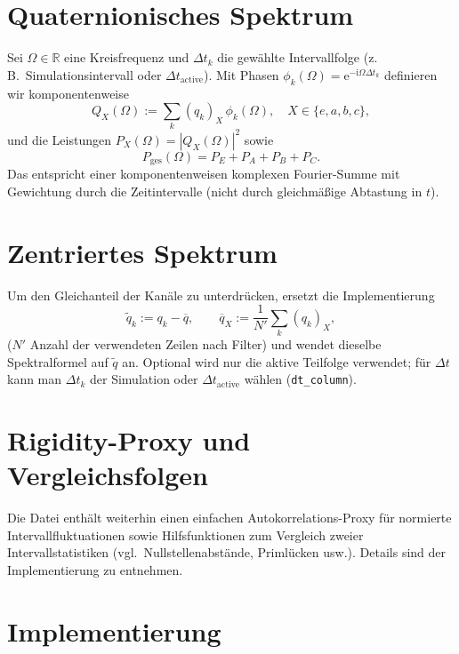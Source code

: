 \documentclass[11pt,a4paper]{article}
\begin{document}
\section{Quaternionisches Spektrum}
\label{sec:spektrum}

Sei $\Omega\in\mathbb{R}$ eine Kreisfrequenz und $\Delta t_k$ die gewählte Intervallfolge
(z.\,B.\ Simulationsintervall oder $\Delta t_{\mathrm{active}}$).
Mit Phasen $\phi_k(\Omega)=\mathrm{e}^{-\mathrm{i}\Omega \Delta t_k}$ definieren wir
komponentenweise
\begin{equation}
  Q_X(\Omega) := \sum_k (q_k)_X\,\phi_k(\Omega),\quad X\in\{e,a,b,c\},
\end{equation}
und die Leistungen $P_X(\Omega)=|Q_X(\Omega)|^2$ sowie
\begin{equation}
  P_{\mathrm{ges}}(\Omega) = P_E+P_A+P_B+P_C.
\end{equation}
Das entspricht einer komponentenweisen komplexen Fourier-Summe mit Gewichtung durch die
Zeitintervalle (nicht durch gleichmäßige Abtastung in $t$).

\section{Zentriertes Spektrum}

Um den Gleichanteil der Kanäle zu unterdrücken, ersetzt die Implementierung
\begin{equation}
  \tilde{q}_k := q_k - \overline{q},\qquad
  \overline{q}_X := \frac{1}{N'}\sum_k (q_k)_X,
\end{equation}
($N'$ Anzahl der verwendeten Zeilen nach Filter) und wendet dieselbe Spektralformel auf
$\tilde{q}$ an. Optional wird nur die aktive Teilfolge verwendet; für $\Delta t$ kann
man $\Delta t_k$ der Simulation oder $\Delta t_{\mathrm{active}}$ wählen (\texttt{dt\_column}).

\section{Rigidity-Proxy und Vergleichsfolgen}

Die Datei enthält weiterhin einen einfachen Autokorrelations-Proxy für normierte
Intervallfluktuationen sowie Hilfsfunktionen zum Vergleich zweier Intervallstatistiken
(vgl.\ Nullstellenabstände, Primlücken usw.). Details sind der Implementierung zu entnehmen.

\section{Implementierung}
\end{document}
